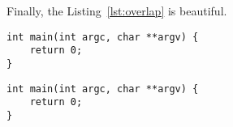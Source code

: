 Finally, the Listing~\ref{lst:overlap} is beautiful.

\begin{lstlisting}[caption={Overlap of computation and communication.},
  label={lst:overlap}]
int main(int argc, char **argv) {
    return 0;
}
\end{lstlisting}

\begin{lstlisting}[caption={Overlap of computation and communication. Here
  with a significantly longer caption. Should exceed a line length, I
  believe. Just keep on typing until it does.}, label={lst:overlap2}]
int main(int argc, char **argv) {
    return 0;
}
\end{lstlisting}
